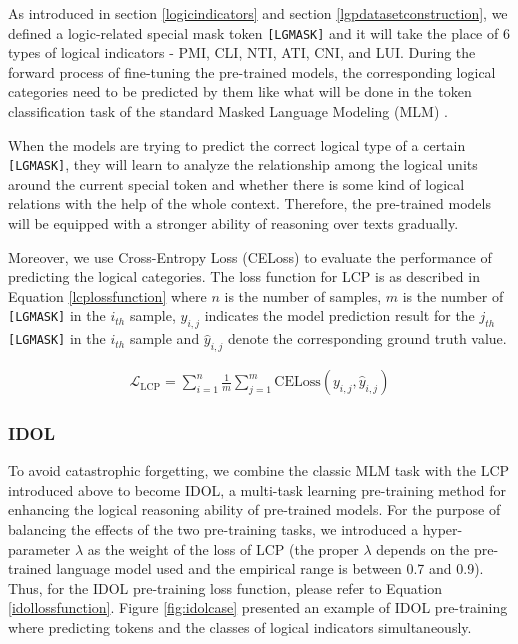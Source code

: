 \documentclass[11pt]{article}
\begin{document}
As introduced in section \ref{logicindicators} and section \ref{lgpdatasetconstruction}, we defined a logic-related special mask token \texttt{[LGMASK]} and it will take the place of 6 types of logical indicators - PMI, CLI, NTI, ATI, CNI, and LUI. During the forward process of fine-tuning the pre-trained models, the corresponding logical categories need to be predicted by them like what will be done in the token classification task of the standard Masked Language Modeling (MLM) \cite{bert}.

When the models are trying to predict the correct logical type of a certain \texttt{[LGMASK]}, they will learn to analyze the relationship among the logical units around the current special token and whether there is some kind of logical relations with the help of the whole context. Therefore, the pre-trained models will be equipped with a stronger ability of reasoning over texts gradually. 

Moreover, we use Cross-Entropy Loss (CELoss) to evaluate the performance of predicting the logical categories. The loss function for LCP is as described in Equation \eqref{lcplossfunction} where $ n $ is the number of samples, $ m $ is the number of \texttt{[LGMASK]} in the $ i_{th} $ sample, $ y_{i,j} $ indicates the model prediction result for the $ j_{th} $ \texttt{[LGMASK]} in the $ i_{th} $ sample and $ \hat{y}_{i,j} $ denote the corresponding ground truth value.

\begin{equation}
\begin{aligned}
\mathcal{L}_{\textrm{LCP}} = \sum_{i=1}^{n} \frac{1}{m}\sum_{j=1}^{m} \textrm{CELoss}(y_{i,j},\hat{y}_{i,j}) \label{lcplossfunction}
\end{aligned}
\end{equation}

\subsubsection{IDOL} To avoid catastrophic forgetting, we combine the classic MLM task with the LCP introduced above to become IDOL, a multi-task learning pre-training method for enhancing the logical reasoning ability of pre-trained models. For the purpose of balancing the effects of the two pre-training tasks, we introduced a hyper-parameter $\lambda$ as the weight of the loss of LCP (the proper $\lambda$ depends on the pre-trained language model used and the empirical range is between 0.7 and 0.9). Thus, for the IDOL pre-training loss function, please refer to Equation \eqref{idollossfunction}. Figure \ref{fig:idolcase} presented an example of IDOL pre-training where predicting tokens and the classes of logical indicators simultaneously.
\end{document}
